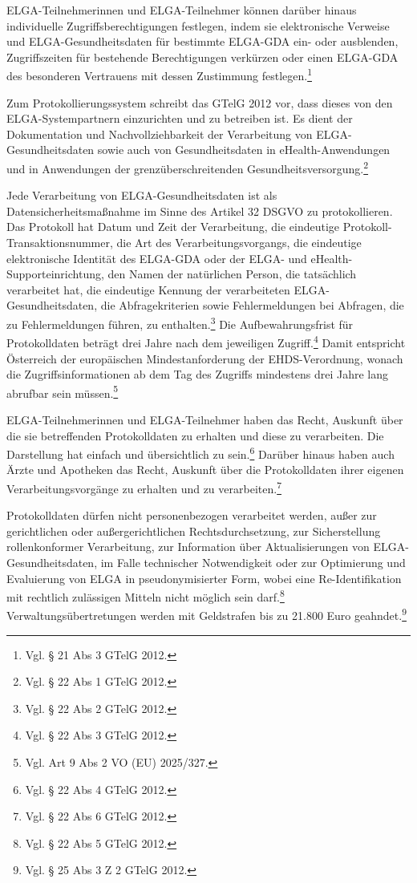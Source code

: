 ELGA-Teilnehmerinnen und ELGA-Teilnehmer können darüber hinaus individuelle Zugriffsberechtigungen festlegen, indem sie elektronische Verweise und ELGA-Gesundheitsdaten für bestimmte ELGA-GDA ein- oder ausblenden, Zugriffszeiten für bestehende Berechtigungen verkürzen oder einen ELGA-GDA des besonderen Vertrauens mit dessen Zustimmung festlegen.\footnote{Vgl. § 21 Abs 3 GTelG 2012.}

Zum Protokollierungssystem schreibt das GTelG 2012 vor, dass dieses von den ELGA-Systempartnern einzurichten und zu betreiben ist. Es dient der Dokumentation und Nachvollziehbarkeit der Verarbeitung von ELGA-Gesundheitsdaten sowie auch von Gesundheitsdaten in eHealth-Anwendungen und in Anwendungen der grenzüberschreitenden Gesundheitsversorgung.\footnote{Vgl. § 22 Abs 1 GTelG 2012.}

Jede Verarbeitung von ELGA-Gesundheitsdaten ist als Datensicherheitsmaßnahme im Sinne des Artikel 32 DSGVO zu protokollieren. Das Protokoll hat Datum und Zeit der Verarbeitung, die eindeutige Protokoll-Transaktionsnummer, die Art des Verarbeitungsvorgangs, die eindeutige elektronische Identität des ELGA-GDA oder der ELGA- und eHealth-Supporteinrichtung, den Namen der natürlichen Person, die tatsächlich verarbeitet hat, die eindeutige Kennung der verarbeiteten ELGA-Gesundheitsdaten, die Abfragekriterien sowie Fehlermeldungen bei Abfragen, die zu Fehlermeldungen führen, zu enthalten.\footnote{Vgl. § 22 Abs 2 GTelG 2012.} Die Aufbewahrungsfrist für Protokolldaten beträgt drei Jahre nach dem jeweiligen Zugriff.\footnote{Vgl. § 22 Abs 3 GTelG 2012.} Damit entspricht Österreich der europäischen Mindestanforderung der EHDS-Verordnung, wonach die Zugriffsinformationen ab dem Tag des Zugriffs mindestens drei Jahre lang abrufbar sein müssen.\footnote{Vgl. Art 9 Abs 2 VO (EU) 2025/327.}

ELGA-Teilnehmerinnen und ELGA-Teilnehmer haben das Recht, Auskunft über die sie betreffenden Protokolldaten zu erhalten und diese zu verarbeiten. Die Darstellung hat einfach und übersichtlich zu sein.\footnote{Vgl. § 22 Abs 4 GTelG 2012.} Darüber hinaus haben auch Ärzte und Apotheken das Recht, Auskunft über die Protokolldaten ihrer eigenen Verarbeitungsvorgänge zu erhalten und zu verarbeiten.\footnote{Vgl. § 22 Abs 6 GTelG 2012.}

Protokolldaten dürfen nicht personenbezogen verarbeitet werden, außer zur gerichtlichen oder außergerichtlichen Rechtsdurchsetzung, zur Sicherstellung rollenkonformer Verarbeitung, zur Information über Aktualisierungen von ELGA-Gesundheitsdaten, im Falle technischer Notwendigkeit oder zur Optimierung und Evaluierung von ELGA in pseudonymisierter Form, wobei eine Re-Identifikation mit rechtlich zulässigen Mitteln nicht möglich sein darf.\footnote{Vgl. § 22 Abs 5 GTelG 2012.} Verwaltungsübertretungen werden mit Geldstrafen bis zu 21.800 Euro geahndet.\footnote{Vgl. § 25 Abs 3 Z 2 GTelG 2012.}


